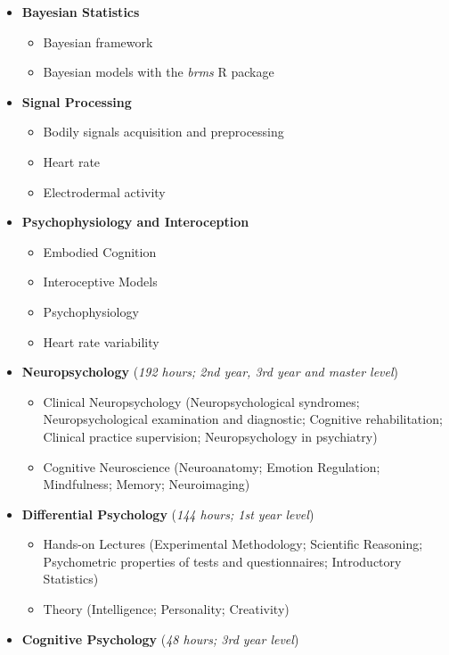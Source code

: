 \documentclass[11pt,a4paper,]{awesome-cv}
\providecommand{\tightlist}{%
	\setlength{\itemsep}{0pt}\setlength{\parskip}{0pt}}
\begin{document}
\begin{itemize}
\tightlist
\item
  \textbf{Bayesian Statistics}

  \begin{itemize}
  \tightlist
  \item
    Bayesian framework
  \item
    Bayesian models with the \emph{brms} R package
  \end{itemize}
\item
  \textbf{Signal Processing}

  \begin{itemize}
  \tightlist
  \item
    Bodily signals acquisition and preprocessing
  \item
    Heart rate
  \item
    Electrodermal activity
  \end{itemize}
\item
  \textbf{Psychophysiology and Interoception}

  \begin{itemize}
  \tightlist
  \item
    Embodied Cognition
  \item
    Interoceptive Models
  \item
    Psychophysiology
  \item
    Heart rate variability
  \end{itemize}
\item
  \textbf{Neuropsychology} (\emph{192 hours; 2nd year, 3rd year and
  master level})

  \begin{itemize}
  \tightlist
  \item
    Clinical Neuropsychology \scriptsize(Neuropsychological syndromes;
    Neuropsychological examination and diagnostic; Cognitive
    rehabilitation; Clinical practice supervision; Neuropsychology in
    psychiatry)\normalsize
  \item
    Cognitive Neuroscience \scriptsize(Neuroanatomy; Emotion Regulation;
    Mindfulness; Memory; Neuroimaging)\normalsize
  \end{itemize}
\item
  \textbf{Differential Psychology} (\emph{144 hours; 1st year level})

  \begin{itemize}
  \tightlist
  \item
    Hands-on Lectures \scriptsize(Experimental Methodology; Scientific
    Reasoning; Psychometric properties of tests and questionnaires;
    Introductory Statistics)\normalsize
  \item
    Theory \scriptsize(Intelligence; Personality; Creativity)\normalsize
  \end{itemize}
\item
  \textbf{Cognitive Psychology} (\emph{48 hours; 3rd year level})


\end{itemize}
\end{document}
